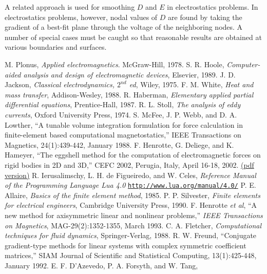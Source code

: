 \documentclass[12pt]{report}
\begin{document}
A related approach is used for smoothing $D$ and $E$ in
electrostatics problems. In electrostatics problems, however, nodal
values of $D$ are found by taking the gradient of a best-fit plane
through the voltage of the neighboring nodes. A number of special
cases must be caught so that reasonable results are obtained at
various boundaries and surfaces.

\newpage
\begin{thebibliography}{99}
 M. Plonus, {\em Applied electromagnetics}. McGraw-Hill, 1978.
 S. R. Hoole, {\em Computer-aided analysis and design of
electromagnetic devices}, Elsevier, 1989.
 J. D. Jackson, {\em Classical electrodynamics, $2^{nd}$ ed},
Wiley, 1975.
 F. M. White, {\em Heat and mass transfer}, Addison-Wesley, 1988.
 R. Haberman, {\em Elementary applied partial differential equations}, Prentice-Hall, 1987.
 R. L. Stoll, {\em The analysis of eddy currents},
Oxford University Press, 1974.
 S. McFee, J. P. Webb, and D. A. Lowther, ``A
tunable volume integration formulation for force calculation in
finite-element based computational magnetostatics,'' IEEE
Transactions on Magnetics, 24(1):439-442, January 1988.
 F. Henrotte, G. Deliege, and K. Hameyer, ``The
eggshell method for the computation of electromagnetic forces on
rigid bodies in 2D and 3D,'' CEFC 2002, Perugia, Italy, April
16-18, 2002.
\href{http://www.esat.kuleuven.ac.be/electa/publications/fulltexts/pub_942.pdf}{(pdf version)}
 R. Ierusalimschy, L. H. de Figueiredo, and W. Celes,
{\em Reference Manual of the Programming Language Lua 4.0}
\href{http://www.lua.org/manual/4.0/}{\tt http://www.lua.org/manual/4.0/}
 P. E. Allaire, {\em Basics of the finite element
method}, 1985.
 P. P. Silvester, {\em Finite elements for electrical engineers},
Cambridge University Press, 1990.
 F. Henrotte {\em et al}, ``A new method for
axisymmetric linear and nonlinear problems,'' {\em IEEE
Transactions on Magnetics}, MAG-29(2):1352-1355, March 1993.
 C. A. Fletcher, {\em Computational techniques
for fluid dynamics}, Springer-Verlag, 1988.
 R. W. Freund, ``Conjugate gradient-type methods
for linear systems with complex symmetric coefficient matrices,''
SIAM Journal of Scientific and Statistical Computing,
13(1):425-448, January 1992.
 E. F. D'Azevedo, P. A. Forsyth, and W. Tang,

\end{thebibliography}
\end{document}
